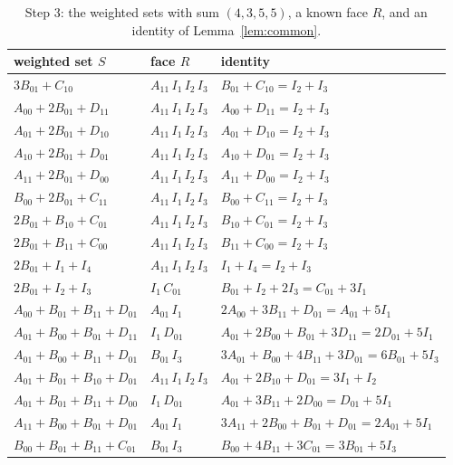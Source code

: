 \documentclass[11pt]{article}
\theoremstyle{definition}
\begin{document}
\begin{appendices}
\begin{table}[ht]
\centering\small
\caption{Step 3: the weighted sets with sum $(4,3,5,5)$, a known face $R$, and an identity of Lemma~\ref{lem:common}.}\label{tab:step3}
\begin{tabular}{lll}
\toprule
weighted set $S$ & face $R$ & identity\\
\midrule
$3B_{01}+C_{10}$ & $A_{11}\,I_1\,I_2\,I_3$ & $B_{01}+C_{10}=I_2+I_3$ \\
$A_{00}+2B_{01}+D_{11}$ & $A_{11}\,I_1\,I_2\,I_3$ & $A_{00}+D_{11}=I_2+I_3$ \\
$A_{01}+2B_{01}+D_{10}$ & $A_{11}\,I_1\,I_2\,I_3$ & $A_{01}+D_{10}=I_2+I_3$ \\
$A_{10}+2B_{01}+D_{01}$ & $A_{11}\,I_1\,I_2\,I_3$ & $A_{10}+D_{01}=I_2+I_3$ \\
$A_{11}+2B_{01}+D_{00}$ & $A_{11}\,I_1\,I_2\,I_3$ & $A_{11}+D_{00}=I_2+I_3$ \\
$B_{00}+2B_{01}+C_{11}$ & $A_{11}\,I_1\,I_2\,I_3$ & $B_{00}+C_{11}=I_2+I_3$ \\
$2B_{01}+B_{10}+C_{01}$ & $A_{11}\,I_1\,I_2\,I_3$ & $B_{10}+C_{01}=I_2+I_3$ \\
$2B_{01}+B_{11}+C_{00}$ & $A_{11}\,I_1\,I_2\,I_3$ & $B_{11}+C_{00}=I_2+I_3$ \\
$2B_{01}+I_1+I_4$ & $A_{11}\,I_1\,I_2\,I_3$ & $I_1+I_4=I_2+I_3$ \\
$2B_{01}+I_2+I_3$ & $I_1\,C_{01}$ & $B_{01}+I_2+2I_3=C_{01}+3I_1$ \\
$A_{00}+B_{01}+B_{11}+D_{01}$ & $A_{01}\,I_1$ & $2A_{00}+3B_{11}+D_{01}=A_{01}+5I_1$ \\
$A_{01}+B_{00}+B_{01}+D_{11}$ & $I_1\,D_{01}$ & $A_{01}+2B_{00}+B_{01}+3D_{11}=2D_{01}+5I_1$ \\
$A_{01}+B_{00}+B_{11}+D_{01}$ & $B_{01}\,I_3$ & $3A_{01}+B_{00}+4B_{11}+3D_{01}=6B_{01}+5I_3$ \\
$A_{01}+B_{01}+B_{10}+D_{01}$ & $A_{11}\,I_1\,I_2\,I_3$ & $A_{01}+2B_{10}+D_{01}=3I_1+I_2$ \\
$A_{01}+B_{01}+B_{11}+D_{00}$ & $I_1\,D_{01}$ & $A_{01}+3B_{11}+2D_{00}=D_{01}+5I_1$ \\
$A_{11}+B_{00}+B_{01}+D_{01}$ & $A_{01}\,I_1$ & $3A_{11}+2B_{00}+B_{01}+D_{01}=2A_{01}+5I_1$ \\
$B_{00}+B_{01}+B_{11}+C_{01}$ & $B_{01}\,I_3$ & $B_{00}+4B_{11}+3C_{01}=3B_{01}+5I_3$ \\
\bottomrule
\end{tabular}
\end{table}


\end{appendices}
\end{document}
